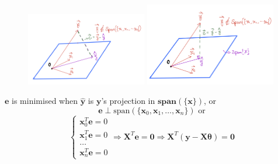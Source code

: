 \documentclass[ignorenonframetext,]{beamer}
\newcommand{\vv}[1]{\boldsymbol{#1}}
\begin{document}
\begin{frame}{}
\protect\hypertarget{section-2}{}

\vspace{-0.3cm}
\begin{figure}
    \centering
   \includegraphics[width = 0.47\textwidth, trim=1.2cm 0.5cm 0.8cm 0cm, clip]{./projview1.png}  \includegraphics[width = 0.51\textwidth, trim=0.5cm 0.5cm 0.5cm 0cm, clip]{./projview2.png}
\end{figure}

\(\vv{e}\) is minimised when \(\hat{\vv{y}}\) is \(\vv{y}\)'s projection
in \(\vv{span}(\{\vv{x}\})\), or
\[\vv{e} \perp \text{span}(\{\vv{x}_0, \vv{x}_1, \ldots, \vv{x}_n\}) \text{ or}\]
\[\begin{cases} \vv{x}_0 ^T \vv{e} = 0 \\ \vv{x}_1 ^T \vv{e} = 0 \\ \ldots\\ \vv{x}_n ^T \vv{e} =0  \end{cases}\Rightarrow \vv{X}^T\vv{e} =\vv{0} \Rightarrow  \vv{X}^T(\vv{y}-\vv{X\theta}) =\vv{0}\]

\end{frame}
\end{document}
